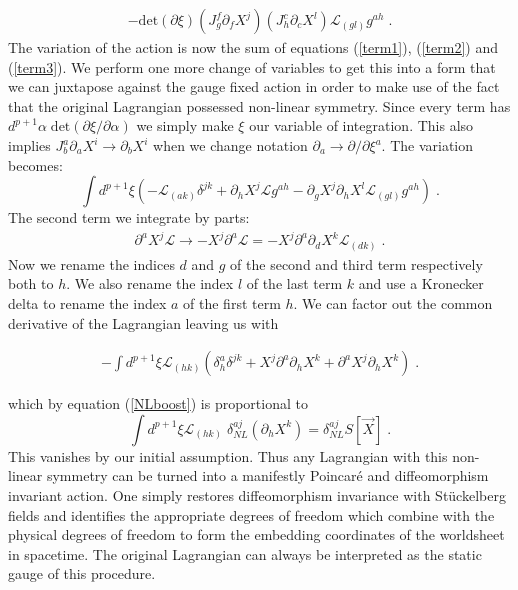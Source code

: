 \documentclass[%
 reprint,
 amsmath,amssymb,
 aps,
]{revtex4-1}
\begin{document}
\begin{eqnarray}
\label{term3}
    - \mathrm{det} ( \partial \xi ) ( J^f_g \partial_f X^j )
    ( J^c_h \partial_{c} X^l ) \mathcal{L}_{(g l)} g^{a h} \; .
\end{eqnarray}
The variation of the action is now the sum of equations (\ref{term1}), (\ref{term2}) and (\ref{term3}).  We perform one more change
of variables to get this into a form that we can juxtapose against the gauge fixed action in order to
make use of the fact that the original Lagrangian possessed non-linear symmetry.  Since
every term has $d^{p+1} \alpha\;\mathrm{det}\left( \partial \xi/\partial \alpha\right)$ we simply make $\xi$
our variable of integration. This also implies $J^a_b \partial_a X^i \rightarrow \partial_b X^i$ when we change notation $\partial_a \rightarrow \partial/\partial \xi^a$.
The variation becomes:
\begin{equation}
\label{diffeq}
    \int d^{p+1} \xi \left(
    -\mathcal{L}_{(a k)} \delta^{j k}
    + \partial_h X^j \mathcal{L} g^{a h}
    - \partial_g X^j \partial_h X^l \mathcal{L}_{(g l)} g^{a h} \right) \; .
\end{equation}
The second term we integrate by parts:
\begin{gather}
    \partial^a X^j \mathcal{L} \rightarrow
    - X^j \partial^a \mathcal{L} = - X^j \partial^a \partial_d X^k \mathcal{L}_{(d k)} \; . \nonumber
\end{gather}
Now we rename the indices $d$ and $g$ of the second and third term respectively both to $h$. We also
rename the index $l$ of the last term $k$ and use a Kronecker delta to rename the index
$a$ of the first term $h$. We can factor out the common derivative of
the Lagrangian leaving us with
\begin{widetext}
    \begin{eqnarray}
        -\int d^{p+1} \xi \mathcal{L}_{(h k)}
        \left( \delta^a_h \delta^{j k} + X^j \partial^a \partial_h X^k
        + \partial^a X^j \partial_h X^k \right) \; . \nonumber
    \end{eqnarray}
\end{widetext}
which by equation (\ref{NLboost}) is proportional to
\begin{equation}
    \int d^{p+1} \xi \mathcal{L}_{(h k)} \; \delta^{a j}_{NL} (\partial_h X^k)
    = \delta^{a j}_{NL} S[\vec{X}] \; .
\end{equation}
This vanishes by our initial assumption. Thus any Lagrangian with this non-linear symmetry can be turned into a
manifestly Poincar\'{e} and diffeomorphism invariant action. One simply restores diffeomorphism invariance
with St\"uckelberg fields and identifies the appropriate degrees of freedom which combine with the physical
degrees of freedom to form the embedding coordinates of the worldsheet in spacetime. The original
Lagrangian can always be interpreted as the static gauge of this procedure.
\end{document}
